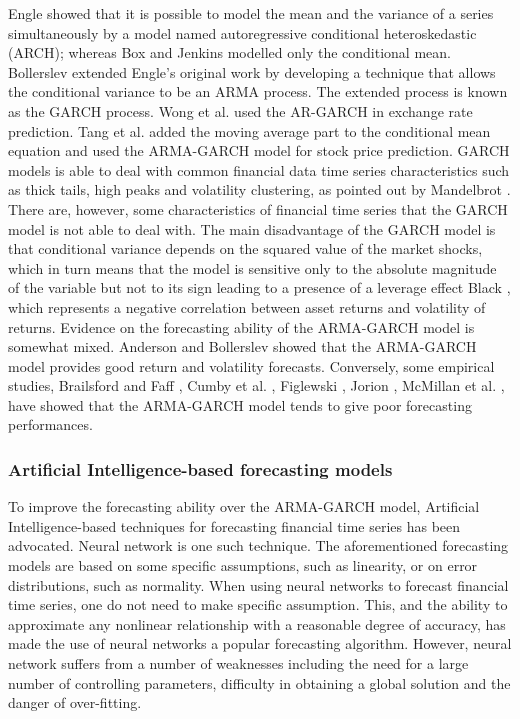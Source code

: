 Engle \cite{Engel} showed that it is possible to model the mean and the variance of a series simultaneously by a model named autoregressive conditional heteroskedastic (ARCH); whereas Box and Jenkins \cite{B&J} modelled only the conditional mean. Bollerslev \cite{Bollerslev} extended Engle’s \cite{Engel} original work by developing a technique that allows the conditional variance to be an ARMA process. The extended process is known as the GARCH process. Wong et al. \cite{Wetal} used the AR-GARCH in exchange rate prediction. Tang et al. \cite{Tetal} added the moving average part to the conditional mean equation and used the ARMA-GARCH model for stock price prediction. GARCH models is able to deal with common financial data time series characteristics such as thick tails, high peaks and volatility clustering, as pointed out by Mandelbrot \cite{Mandelbrot}. There are, however, some characteristics of financial time series that the GARCH model is not able to deal with. The main disadvantage of the GARCH model is that conditional variance depends on the squared value of the market shocks, which in turn means that the model is sensitive only to the absolute magnitude of the variable but not to its sign leading to a presence of a leverage effect Black \cite{Black}, which represents a negative correlation between asset returns and volatility of returns. Evidence on the forecasting ability of the ARMA-GARCH model is somewhat mixed. Anderson and Bollerslev \cite{A&B} showed that the ARMA-GARCH model provides good return and volatility forecasts. Conversely, some empirical studies, Brailsford and Faff \cite{f1}, Cumby et al. \cite{f2}, Figlewski \cite{f3},  Jorion \cite{f4}\cite{f5}, McMillan et al. \cite{f6}, have showed that the ARMA-GARCH model tends to give poor forecasting performances. 

\subsubsection{Artificial Intelligence-based forecasting models}

To improve the forecasting ability over the ARMA-GARCH model, Artificial Intelligence-based techniques for forecasting financial time series has been advocated. Neural network is one such technique. The aforementioned forecasting models are based on some specific assumptions, such as linearity, or on error distributions, such as normality. When using neural networks to forecast financial time series, one do not need to make specific assumption. This, and the ability to approximate any nonlinear relationship with a reasonable degree of accuracy, has made the use of neural networks a popular forecasting algorithm. However, neural network suffers from a number of weaknesses including the need for a large number of controlling parameters, difficulty in obtaining a global solution and the danger of over-fitting.

